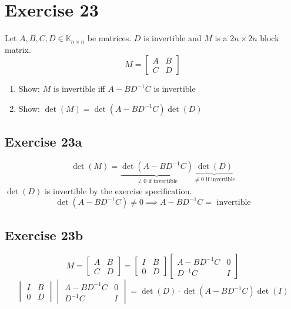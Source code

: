 \documentclass[a4paper]{article}
\theoremstyle{definition}
\begin{document}
\section*{Exercise 23}
\begin{ex}
  Let $A, B, C, D \in \mathbb K_{n\times n}$ be matrices.
  $D$ is invertible and $M$ is a $2n \times 2n$ block matrix.
  \[ M = \begin{bmatrix} A & B \\ C & D \end{bmatrix} \]
  \begin{enumerate}
    \item Show: $M$ is invertible iff $A - BD^{-1}C$ is invertible
    \item Show: $\det(M) = \det(A - BD^{-1} C) \det(D)$
  \end{enumerate}
\end{ex}

\subsection{Exercise 23a}
\[ \det(M) = \underbrace{\det(A - BD^{-1} C)}_{\neq 0 \text{ if invertible}} \underbrace{\det(D)}_{\neq 0 \text{ if invertible}} \]
$\det(D)$ is invertible by the exercise specification.
\[ \det(A - BD^{-1} C) \neq 0 \implies A - BD^{-1} C = \text{ invertible} \]

\subsection{Exercise 23b}
\[
  M = \begin{bmatrix} A & B \\ C & D \end{bmatrix}
  = \begin{bmatrix} I & B \\ 0 & D \end{bmatrix} \begin{bmatrix} A-BD^{-1}C & 0 \\ D^{-1}C & I \end{bmatrix}
\] \[
  \begin{vmatrix} I & B \\ 0 & D \end{vmatrix}
  \begin{vmatrix} A - BD^{-1} C & 0 \\ D^{-1} C & I \end{vmatrix}
  = \det(D) \cdot \det(A - BD^{-1}C) \det(I)
\]
\end{document}
